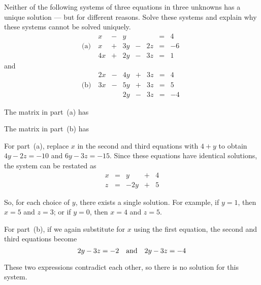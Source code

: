 \documentclass{ximera}
\begin{document}
\begin{exercise} \label{c2.1.9}
Neither of the following systems of three equations in three
unknowns has a unique solution --- but for different
reasons.  Solve these systems and explain why these systems
cannot be solved uniquely.
\[
\mbox{(a) }\; \begin{array}{rcrcrcr}
  x & - &  y &   &    & = &  4\\
  x & + & 3y & - & 2z & = & -6\\
 4x & + & 2y & - & 3z & = &  1
              \end{array}
            \]
            and
            \[\mbox{(b) }\; \begin{array}{rcrcrcr}
 2x & - & 4y & + & 3z & = &  4\\
 3x & - & 5y & + & 3z & = &  5\\
    &   & 2y & - & 3z & = & -4
\end{array}
\]
\begin{prompt}
  The matrix in part~(a) has
  \begin{multipleChoice}
  \end{multipleChoice}

  The matrix in part~(b) has
  \begin{multipleChoice}
  \end{multipleChoice}
\end{prompt}

\begin{hint}
For part~(a), replace $x$ in the second and third equations with
$4 + y$ to obtain $4y - 2z = -10$ and $6y - 3z = -15$.  Since these
equations have identical solutions, the system can be restated as
\[
\begin{array}{rrrrrrr}
x & = & y & + & 4 \\ 
z & = & -2y & + & 5\end{array}
\]
\end{hint}
\begin{hint}
So, for each choice of $y$, there exists a single solution.  For
example, if $y = 1$, then $x = 5$ and $z = 3$; or if $y = 0$, then
$x = 4$ and $z = 5$.  
\end{hint}
\begin{hint}
For part~(b), if we again substitute for $x$ using the first equation, the
second and third equations become
\[
2y - 3z = -2 \quad\mbox{and}\quad 2y - 3z = -4
\]
\end{hint}
\begin{hint}
These two expressions contradict each other, so there is no solution
for this system.  
\end{hint}


\end{exercise}
\end{document}
